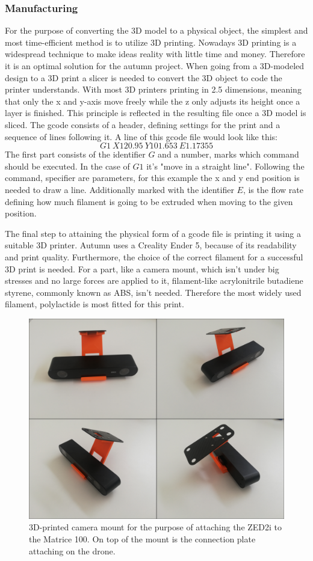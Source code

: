 \subsubsection{Manufacturing}

For the purpose of converting the 3D model to a physical object, the simplest and most time-efficient method is to utilize 3D printing. Nowadays 3D printing is a widespread technique to make ideas reality with little time and money. Therefore it is an optimal solution for the autumn project. 
When going from a 3D-modeled design to a 3D print a slicer is needed to convert the 3D object to code the printer understands. With most 3D printers printing in 2.5 dimensions, meaning that only the x and y-axis move freely while the z only adjusts its height once a layer is finished. This principle is reflected in the resulting file once a 3D model is sliced. The gcode consists of a header, defining settings for the print and a sequence of lines following it. A line of this gcode file would look like this: 
\[G1\ X120.95\ Y101.653\ E1.17355\]
The first part consists of the identifier $G$ and a number, marks which command should be executed. In the case of $G1$ it's "move in a straight line". Following the command, specifier are parameters, for this example the x and y end position is needed to draw a line. Additionally marked with the identifier $E$, is the flow rate defining how much filament is going to be extruded when moving to the given position.

The final step to attaining the physical form of a gcode file is printing it using a suitable 3D printer. Autumn uses a Creality Ender 5, because of its readability and print quality. Furthermore, the choice of the correct filament for a successful 3D print is needed. For a part, like a camera mount, which isn't under big stresses and no large forces are applied to it, filament-like acrylonitrile butadiene styrene, commonly known as ABS, isn't needed. Therefore the most widely used filament, polylactide is most fitted for this print.

\begin{figure}[h]
	\centering
	\includegraphics[width=0.6\linewidth]{img/MountPrint}
	\caption{3D-printed camera mount for the purpose of attaching the ZED2i to the Matrice 100. On top of the mount is the connection plate attaching on the drone.}
	\label{fig:custom_parts_mountPrint}
\end{figure}

